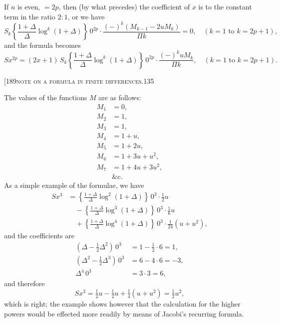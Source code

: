 \documentclass[11pt]{article}
\begin{document}
If $n$ is even, $= 2p$, then (by what precedes) the coefficient of $x$ is to the constant
term in the ratio $2:1$, or we have
\[
S_{k}\left\{\frac{1+\Delta}{\Delta}\log^{k}(1+\Delta)\right\}\,0^{2p}\cdot\frac{(-)^{k}(M_{k-1} - 2u M_{k})}{\Pi k} = 0,\quad (k=1 \text{ to } k = 2p+1),
\]
and the formula becomes
\[
S x^{2p} = (2x+1)\, S_{k}\left\{\frac{1+\Delta}{\Delta}\log^{k}(1+\Delta)\right\}\,0^{2p}\cdot\frac{(-)^{k} u M_{k}}{\Pi k},\quad (k=1 \text{ to } k = 2p+1).
\]

\begin{center}\small[189\hfill\textsc{note on a formula in finite differences.}\hfill\textsc{135}\end{center}

\noindent The values of the functions $M$ are as follows:
\[
\begin{aligned}
M_{1} &= 0,\\
M_{2} &= 1,\\
M_{3} &= 1,\\
M_{4} &= 1 + u,\\
M_{5} &= 1 + 2u,\\
M_{6} &= 1 + 3u + u^{2},\\
M_{7} &= 1 + 4u + 3u^{2},\\
&\&\text{c.}
\end{aligned}
\]
As a simple example of the formulae, we have
\[
\begin{aligned}
S x^{3} &= \left\{\frac{1+\Delta}{\Delta}\log^{2}(1+\Delta)\right\}\,0^{3}\cdot\tfrac{1}{2}u\\
&\quad - \left\{\frac{1+\Delta}{\Delta}\log^{3}(1+\Delta)\right\}\,0^{3}\cdot\tfrac{1}{6}u\\
&\quad + \left\{\frac{1+\Delta}{\Delta}\log^{4}(1+\Delta)\right\}\,0^{3}\cdot\tfrac{1}{24}(u + u^{2}),
\end{aligned}
\]
and the coefficients are
\[
\begin{aligned}
(\Delta - \tfrac{1}{2}\Delta^{2})\, 0^{3} &= 1 - \tfrac{1}{2}\cdot 6 = 1,\\
(\Delta^{2} - \tfrac{1}{2}\Delta^{3})\, 0^{3} &= 6 - 4\cdot 6 = -3,\\
\Delta^{4}\, 0^{3} &= 3\cdot 3 = 6,
\end{aligned}
\]
and therefore
\[
S x^{3} = \tfrac{1}{2}u - \tfrac{1}{2}u + \tfrac{1}{4}(u + u^{2}) = \tfrac{1}{2}u^{2},
\]
which is right; the example shows however that the calculation for the higher powers
would be effected more readily by means of Jacobi's recurring formula.
\end{document}
